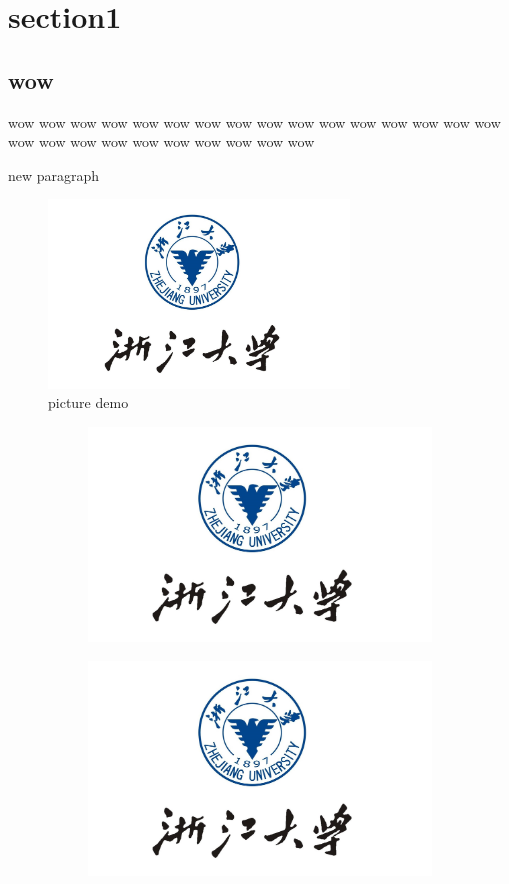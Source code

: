 \newpage
\section{section1}
\subsection{wow}
wow wow wow wow wow wow wow wow wow wow wow wow wow wow wow wow wow wow wow
wow wow wow wow wow wow wow
\par
new paragraph
\\
\begin{figure}[!hbtp] %
    \centering
    \includegraphics[width=8cm]{title/logo.png} %
    \caption{picture demo}           %
\end{figure}

\begin{figure}[!hbtp]
    \centering
    \begin{subfigure}[b]{0.5\linewidth}
        \includegraphics[width=0.8\linewidth]{title/logo.png}
    \end{subfigure}
    \begin{subfigure}[b]{0.5\linewidth}
        \includegraphics[width=0.8\linewidth]{title/logo.png}
    \end{subfigure}
\end{figure}

